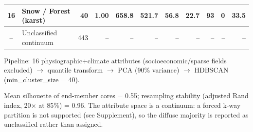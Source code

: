 \begin{table}[htbp]
\begin{tabular}{clrrrrrrrrr}
16 & Snow / Forest (karst) & 40 & 1.00 & 658.8 & 521.7 & 56.8 & 22.7 & 93 & 0 & 33.5 \\
\midrule
-- & Unclassified continuum & 443 & -- & -- & -- & -- & -- & -- & -- & -- \\
\bottomrule
\end{tabular}
\begin{tablenotes}
\item Pipeline: 16 physiographic+climate attributes (socioeconomic/sparse fields excluded) $\rightarrow$ quantile transform $\rightarrow$ PCA (90\% variance) $\rightarrow$ HDBSCAN (min\_cluster\_size = 40).
\item Mean silhouette of end-member cores = 0.55; resampling stability (adjusted Rand index, 20$\times$ at 85\%) = 0.96. The attribute space is a continuum: a forced k-way partition is not supported (see Supplement), so the diffuse majority is reported as unclassified rather than assigned.
\end{tablenotes}
\end{table}
